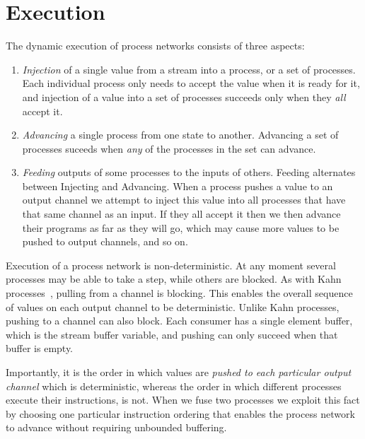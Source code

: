 \section{Execution}
\label{s:Process:Eval}

The dynamic execution of process networks consists of three aspects:

\begin{enumerate}
\item \emph{Injection} of a single value from a stream into a process, or a set of processes. Each individual process only needs to accept the value when it is ready for it, and injection of a value into a set of processes succeeds only when they \emph{all} accept it.

\item \emph{Advancing} a single process from one state to another. Advancing a set of processes suceeds when \emph{any} of the processes in the set can advance.

\item \emph{Feeding} outputs of some processes to the inputs of others. Feeding alternates between Injecting and Advancing. When a process pushes a value to an output channel we attempt to inject this value into all processes that have that same channel as an input. If they all accept it then we then advance their programs as far as they will go, which may cause more values to be pushed to output channels, and so on.
\end{enumerate}

Execution of a process network is non-deterministic. At any moment several processes may be able to take a step, while others are blocked. As with Kahn processes~\cite{kahn1976coroutines}, pulling from a channel is blocking. This enables the overall sequence of values on each output channel to be deterministic. Unlike Kahn processes, pushing to a channel can also block. Each consumer has a single element buffer, which is the stream buffer variable, and pushing can only succeed when that buffer is empty.


Importantly, it is the order in which values are \emph{pushed to each particular output channel} which is deterministic, whereas the order in which different processes execute their instructions, is not. When we fuse two processes we exploit this fact by choosing one particular instruction ordering that enables the process network to advance without requiring unbounded buffering.

